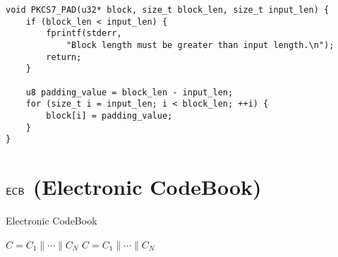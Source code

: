 \begin{lstlisting}[style=C]
void PKCS7_PAD(u32* block, size_t block_len, size_t input_len) {
	if (block_len < input_len) {
		fprintf(stderr,
			"Block length must be greater than input length.\n");
		return;
	}
	
	u8 padding_value = block_len - input_len;
	for (size_t i = input_len; i < block_len; ++i) {
		block[i] = padding_value;
	}
}
\end{lstlisting}

\newpage
\section{$\mathsf{ECB}$ (Electronic CodeBook)}
\begin{algorithm}[H]
	\caption{Electronic CodeBook}
	\begin{multicols}{2}
		\BlankLine
		\Return $C=C_1\parallel\cdots\parallel C_N$\;
		\columnbreak %
		\setcounter{AlgoLine}{0}  %
		\BlankLine
		\Return $C=C_1\parallel\cdots\parallel C_N$\;
	\end{multicols}
	\BlankLine
\end{algorithm}